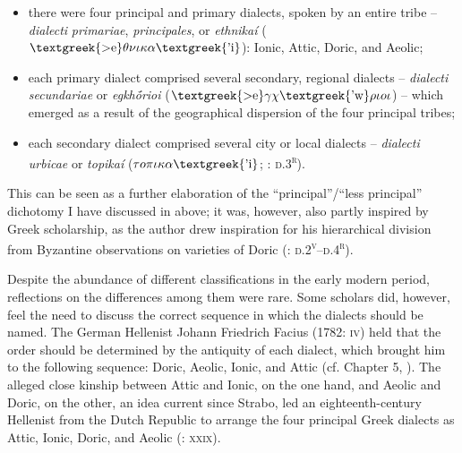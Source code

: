 \documentclass[output=paper]{langsci/langscibook}
\begin{document}
\begin{itemize}
\item there were four principal and primary dialects, spoken by an entire tribe – \textit{dialecti} \textit{primariae}, \textit{principales}, or \textit{ethnikaí} ($\text{\textgreek{>e}}\theta \nu \iota \kappa \alpha \text{\textgreek{'i}}$): Ionic, Attic, Doric, and Aeolic;

\item each primary dialect comprised several secondary, regional dialects – \textit{dialecti} \textit{secundariae} or \textit{egkhṓrioi} ($\text{\textgreek{>e}}\gamma \chi \text{\textgreek{'w}}\rho \iota o\iota $) – which emerged as a result of the geographical dispersion of the four principal tribes;

\item each secondary dialect comprised several city or local dialects – \textit{dialecti} \textit{urbicae} or \textit{topikaí} ($\tau o\pi \iota \kappa \alpha \text{\textgreek{'i}}$; \citealt{Thryllitsch1709}: \textsc{d.3}\textsc{\textsuperscript{r}}).

\end{itemize}

This can be seen as a further elaboration of the “principal”/“less principal” dichotomy I have discussed in  above; it was, however, also partly inspired by Greek scholarship, as the author drew inspiration for his hierarchical division from Byzantine observations on varieties of Doric (\citealt{Thryllitsch1709}: \textsc{d.2}\textsc{\textsuperscript{v}}\textsc{–d.4}\textsc{\textsuperscript{r}}).

Despite the abundance of different classifications in the early modern period, reflections on the differences among them were rare. Some scholars did, however, feel the need to discuss the correct sequence in which the dialects should be named. The German Hellenist Johann Friedrich Facius (1782: \textsc{iv}) held that the order should be determined by the antiquity of each dialect, which brought him to the following sequence: Doric, Aeolic, Ionic, and Attic (cf. Chapter 5, ). The alleged close kinship between Attic and Ionic, on the one hand, and Aeolic and Doric, on the other, an idea current since Strabo, led an eighteenth-century Hellenist from the Dutch Republic to arrange the four principal Greek dialects as Attic, Ionic, Doric, and Aeolic (\citealt{Koen1766}: \textsc{xxix}).
\end{document}
